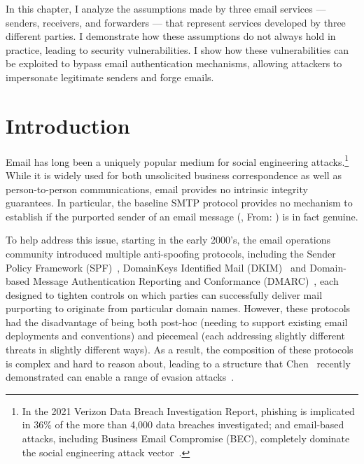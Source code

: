 In this chapter, I analyze the assumptions made by three email services --- senders, receivers, and forwarders --- that
represent services developed by three different parties. I  demonstrate how these assumptions do not always hold in practice, leading to security
vulnerabilities. I show how these vulnerabilities can be exploited to bypass email authentication
mechanisms, allowing attackers to impersonate legitimate senders and forge emails.

\section{Introduction}
Email has long been a uniquely popular medium for social engineering
attacks.\footnote{In the 2021 Verizon Data Breach Investigation
  Report, phishing is implicated in 36\% of the more than 4,000 data
  breaches investigated; and email-based attacks, including Business
  Email Compromise (BEC), completely dominate the social engineering
  attack vector~\cite{dbir2021}.}  While it is widely used for
both unsolicited business correspondence as well as person-to-person
communications, email provides no intrinsic integrity guarantees.  In
particular, the baseline SMTP protocol provides no mechanism to
establish if the purported sender of an email message (\eg, From:
) is in fact genuine.

To help address this issue, starting in the early 2000's, the email
operations community introduced multiple anti-spoofing protocols,
including the Sender Policy Framework (SPF)~\cite{rfc7208}, DomainKeys
Identified Mail
(DKIM)~\cite{rfc6376} and Domain-based Message Authentication
Reporting and Conformance (DMARC)~\cite{rfc7489}, each designed to
tighten controls on which parties can successfully deliver
mail purporting to originate from particular domain names.  However,
these protocols had the disadvantage of being both post-hoc (needing
to support existing email deployments and conventions) and piecemeal
(each addressing slightly different threats in slightly different
ways).  As a result, the composition of these protocols is complex and
hard to reason about, leading to a structure that Chen \etal\ recently
demonstrated can enable a range of evasion
attacks~\cite{chen2020composition}.

